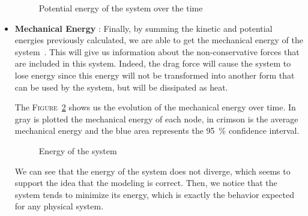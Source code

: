\begin{itemize}
    \begin{figure}[!htb]
        \centering
        
        \caption{Potential energy of the system over the time}
        \label{fig:potential_energy}
    \end{figure}

    \item \textbf{Mechanical Energy} : Finally, by summing the kinetic and potential energies previously calculated, we are able to get the mechanical energy of the system~\cite{viegas2004kinetic}. This will give us information about the non-conservative forces that are included in this system. Indeed, the drag force will cause the system to lose energy since this energy will not be transformed into another form that can be used by the system, but will be dissipated as heat.

    The \textsc{Figure}~\ref{fig:energy} shows us the evolution of the mechanical energy over time. In gray is plotted the mechanical energy of each node, in crimson is the average mechanical energy and the blue area represents the 95~\% confidence interval.
    
    \begin{figure}[!htb]
        \centering
        
        \caption{Energy of the system}
        \label{fig:energy}
    \end{figure}

    We can see that the energy of the system does not diverge, which seems to support the idea that the modeling is correct. Then, we notice that the system tends to minimize its energy, which is exactly the behavior expected for any physical system.
\end{itemize}
